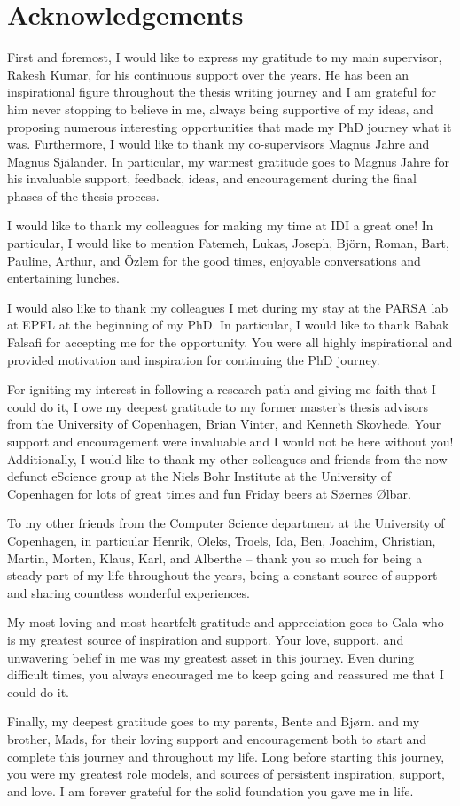 \documentclass[../main.tex]{subfiles}
\begin{document}
\chapter{Acknowledgements}

First and foremost, I would like to express my gratitude to my main
supervisor, Rakesh Kumar, for his continuous support over the
years. He has been an inspirational figure throughout the thesis
writing journey and I am grateful for him never stopping to believe in
me, always being supportive of my ideas, and proposing numerous
interesting opportunities that made my PhD journey what it
was. Furthermore, I would like to thank my co-supervisors Magnus Jahre
and Magnus Själander. In particular, my warmest gratitude goes to
Magnus Jahre for his invaluable support, feedback, ideas, and encouragement
during the final phases of the thesis process.

I would like to thank my colleagues for making my time at IDI a
great one! In particular, I would like to mention Fatemeh, Lukas,
Joseph, Björn, Roman, Bart, Pauline, Arthur, and Özlem for the good
times, enjoyable conversations and entertaining lunches.

I would also like to thank my colleagues I met during my stay at the
PARSA lab at EPFL at the beginning of my PhD. In particular, I would
like to thank Babak Falsafi for accepting me for the opportunity. You
were all highly inspirational and provided motivation and inspiration
for continuing the PhD journey.

For igniting my interest in following a research path and giving me
faith that I could do it, I owe my deepest gratitude to my former
master's thesis advisors from the University of Copenhagen, Brian Vinter, and Kenneth Skovhede. Your support and encouragement were invaluable and I would not be here without you! Additionally, I would like to thank my other colleagues and friends from the now-defunct eScience group at the Niels Bohr Institute at the University of Copenhagen for lots of great times and fun Friday beers at Søernes Ølbar.

To my other friends from the Computer Science department at the
University of Copenhagen, in particular Henrik, Oleks, Troels, Ida,
Ben, Joachim, Christian, Martin, Morten, Klaus, Karl, and Alberthe --
thank you so much for being a steady part of my life throughout the
years, being a constant source of support and sharing countless
wonderful experiences.

My most loving and most heartfelt gratitude and appreciation goes to
Gala who is my greatest source of inspiration and support. Your love,
support, and unwavering belief in me was my greatest asset in this
journey. Even during difficult times, you always encouraged me to keep
going and reassured me that I could do it.

Finally, my deepest gratitude goes to my parents, Bente and Bjørn. and
my brother, Mads, for their loving support and encouragement both to
start and complete this journey and throughout my life. Long before
starting this journey, you were my greatest role models, and sources of
persistent inspiration, support, and love. I am forever grateful for
the solid foundation you gave me in life.

\newpage
\end{document}
